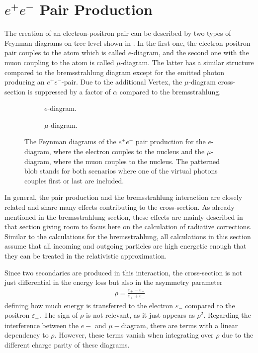 %
% 
%
%

\section{$e^+e^-$ Pair Production} \label{sec:epair}

The creation of an electron-positron pair can be described by two types of Feynman diagrams on tree-level shown in .
In the first one, the electron-positron pair couples to the atom which is called $e$-diagram, and the second one with the muon coupling to the atom is called $\mu$-diagram.
The latter has a similar structure compared to the bremsstrahlung diagram except for the emitted photon producing an $e^+e^-$-pair.
Due to the additional Vertex, the $\mu$-diagram cross-section is suppressed by a factor of $\alpha$ compared to the bremsstrahlung.
\begin{figure}
    \begin{subfigure}{0.48\textwidth}
        \centering
        
        \caption{$e$-diagram.}
        \label{fig:feyn_epair_e}
    \end{subfigure}
    \hfill
    \begin{subfigure}{0.48\textwidth}
        \centering
        
        \caption{$\mu$-diagram.}
        \label{fig:feyn_epair_mu}
    \end{subfigure}
    \caption{The Feynman diagrams of the $e^+e^-$ pair production for the $e$-diagram, where the electron couples to the nucleus and the $\mu$-diagram, where the muon couples to the nucleus. The patterned blob stands for both scenarios where one of the virtual photons couples first or last are included.}
    \label{fig:feyn_epair}
\end{figure}

In general, the pair production and the bremsstrahlung interaction are closely related and share many effects contributing to the cross-section.
As already mentioned in the bremsstrahlung section, these effects are mainly described in that section giving room to focus here on the calculation of radiative corrections.
Similar to the calculations for the bremsstrahlung, all calculations in this section assume that all incoming and outgoing particles are high energetic enough that they can be treated in the relativistic approximation.

Since two secondaries are produced in this interaction, the cross-section is not just differential in the energy loss but also in the asymmetry parameter
\begin{align} \label{eq:epair_rho}
    \rho = \frac{\varepsilon_+ - \varepsilon_-}{\varepsilon_+ + \varepsilon_-}
\end{align}
defining how much energy is transferred to the electron $\varepsilon_{-}$ compared to the positron $\varepsilon_{+}$.
The sign of $\rho$ is not relevant, as it just appears as $\rho^2$.
Regarding the interference between the $e-$ and $\mu-$diagram, there are terms with a linear dependency to $\rho$.
However, these terms vanish when integrating over $\rho$ due to the different charge parity of these diagrams.

